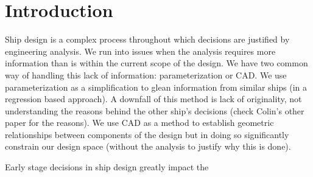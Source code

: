 \documentclass[preprint,12pt]{elsarticle}
\begin{document}
\section{Introduction} \label{sec:intro}
Ship design is a complex process throughout which decisions are justified by engineering analysis. We run into issues when the analysis requires more information than is within the current scope of the design. We have two common way of handling this lack of information: parameterization or CAD. We use parameterization as a simplification to glean information from similar ships (in a regression based approach). A downfall of this method is lack of originality, not understanding the reasons behind the other ship's decisions (check Colin's other paper for the reasons). We use CAD as a method to establish geometric relationships between components of the design but in doing so significantly constrain our design space (without the analysis to justify why this is done).



Early stage decisions in ship design greatly impact the 
\end{document}

